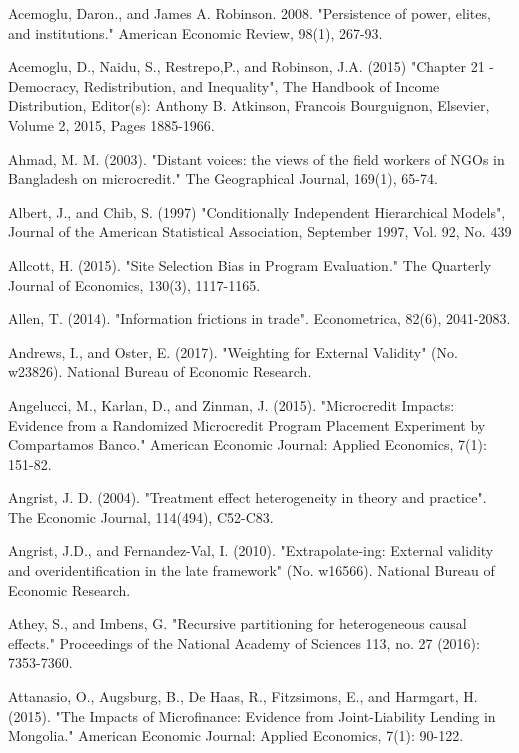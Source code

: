 \documentclass[english,12pt]{article}\usepackage{lmodern}
\numberwithin{equation}{section}
\begin{document}
\clearpage
\newpage
\begin{thebibliography}{99}

 Acemoglu, Daron., and James A. Robinson. 2008. "Persistence of power, elites, and institutions." American Economic Review, 98(1), 267-93.

 Acemoglu, D., Naidu, S., Restrepo,P., and Robinson, J.A. (2015) "Chapter 21 - Democracy, Redistribution, and Inequality", The Handbook of Income Distribution, Editor(s): Anthony B. Atkinson, Francois Bourguignon, Elsevier, Volume 2, 2015, Pages 1885-1966.

 Ahmad, M. M. (2003). "Distant voices: the views of the field workers of NGOs in Bangladesh on microcredit." The Geographical Journal, 169(1), 65-74.

 Albert, J., and Chib, S. (1997) "Conditionally Independent Hierarchical Models", Journal of the American Statistical Association, September 1997, Vol. 92, No. 439

 Allcott, H. (2015). "Site Selection Bias in Program Evaluation." The Quarterly Journal of Economics, 130(3), 1117-1165.

 Allen, T. (2014). "Information frictions in trade". Econometrica, 82(6), 2041-2083.

 Andrews, I., and Oster, E. (2017). "Weighting for External Validity" (No. w23826). National Bureau of Economic Research.

 Angelucci, M., Karlan, D., and Zinman, J. (2015). "Microcredit Impacts: Evidence from a Randomized Microcredit Program Placement Experiment by Compartamos Banco." American Economic Journal: Applied Economics, 7(1): 151-82.

 Angrist, J. D. (2004). "Treatment effect heterogeneity in theory and practice". The Economic Journal, 114(494), C52-C83.

 Angrist, J.D., and Fernandez-Val, I. (2010). "Extrapolate-ing: External validity and overidentification in the late framework" (No. w16566). National Bureau of Economic Research.

 Athey, S., and Imbens, G. "Recursive partitioning for heterogeneous causal effects." Proceedings of the National Academy of Sciences 113, no. 27 (2016): 7353-7360.

 Attanasio, O., Augsburg, B., De Haas, R., Fitzsimons, E., and Harmgart, H. (2015). "The Impacts of Microfinance: Evidence from Joint-Liability Lending in Mongolia." American Economic Journal: Applied Economics, 7(1): 90-122.


\end{thebibliography}
\end{document}

